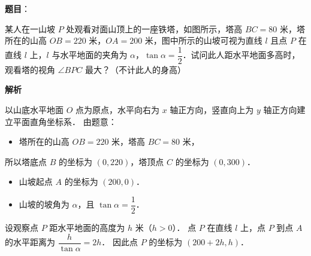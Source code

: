 \begin{answer}

\textbf{题目}：

某人在一山坡 $P$ 处观看对面山顶上的一座铁塔，如图所示，塔高 $BC = 80$ 米，塔所在的山高 $OB = 220$ 米，$OA = 200$ 米，图中所示的山坡可视为直线 $l$ 且点 $P$ 在直线 $l$ 上，$l$ 与水平地面的夹角为 $\alpha$，$\tan \alpha = \dfrac{1}{2}$．试问此人距水平地面多高时，观看塔的视角 $\angle BPC$ 最大？（不计此人的身高）
\nopagebreak[4]
\begin{center}\end{center}
\nopagebreak[4]
\textbf{解析}

以山底水平地面 $O$ 点为原点，水平向右为 $x$ 轴正方向，竖直向上为 $y$ 轴正方向建立平面直角坐标系．
由题意：
\begin{itemize}
\item 塔所在的山高 $OB = 220$ 米，塔高 $BC = 80$ 米，
\end{itemize}
  所以塔底点 $B$ 的坐标为 $(0, 220)$，塔顶点 $C$ 的坐标为 $(0, 300)$．
\begin{itemize}
\item 山坡起点 $A$ 的坐标为 $(200, 0)$．
\item 山坡的坡角为 $\alpha$，且 $\tan \alpha = \dfrac{1}{2}$．
\end{itemize}
设观察点 $P$ 距水平地面的高度为 $h$ 米（$h > 0$）．
点 $P$ 在直线 $l$ 上，点 $P$ 到点 $A$ 的水平距离为 $\dfrac{h}{\tan \alpha} = 2h$．
因此点 $P$ 的坐标为 $(200 + 2h, h)$．


\end{answer}
